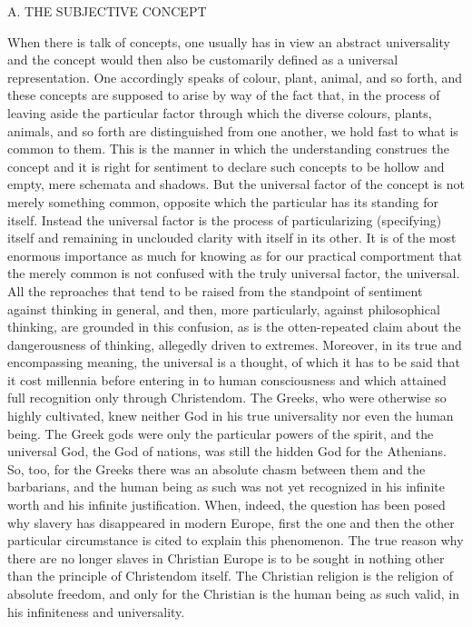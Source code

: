 A. THE SUBJECTIVE CONCEPT

When there is talk of concepts, one usually has in view an abstract
universality and the concept would then also be customarily defined as a universal
representation. One accordingly speaks of colour, plant, animal, and so forth,
and these concepts are supposed to arise by way of the fact that, in the process
of leaving aside the particular factor through which the diverse colours, plants,
animals, and so forth are distinguished from one another, we hold fast to what
is common to them. This is the manner in which the understanding construes
the concept and it is right for sentiment to declare such concepts to be
hollow and empty, mere schemata and shadows. But the universal factor of the
concept is not merely something common, opposite which the particular has its
standing for itself. Instead the universal factor is the process of particularizing
(specifying) itself and remaining in unclouded clarity with itself in its other. It
is of the most enormous importance as much for knowing as for our practical
comportment that the merely common is not confused with the truly universal
factor, the universal. All the reproaches that tend to
be raised from the standpoint of sentiment against thinking in general, and then,
more particularly, against philosophical thinking, are grounded in this confusion,
as is the otten-repeated claim about the dangerousness of thinking, allegedly driven
to extremes. Moreover, in its true and encompassing meaning, the universal is a
thought, of which it has to be said that it cost millennia before entering in to human
consciousness and which attained full recognition only through Christendom. The
Greeks, who were otherwise so highly cultivated, knew neither God in his true
universality nor even the human being. The Greek gods were only the particular
powers of the spirit, and the universal God, the God of nations, was still the
hidden God for the Athenians. So, too, for the Greeks there was an absolute
chasm between them and the barbarians, and the human being as such was not
yet recognized in his infinite worth and his infinite justification. When, indeed,
the question has been posed why slavery has disappeared in modern Europe,
first the one and then the other particular circumstance is cited to explain this
phenomenon.
The true reason why there are no longer slaves in Christian Europe
is to be sought in nothing other than the principle of Christendom itself.
The Christian religion is the religion of absolute freedom, and only for the Christian is
the human being as such valid, in his infiniteness and universality.

